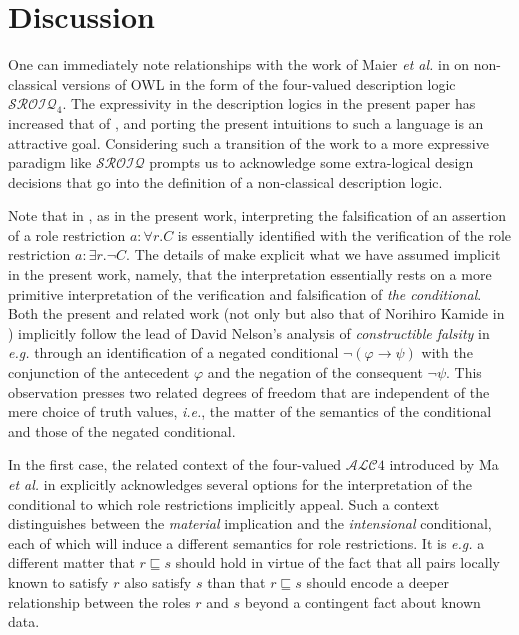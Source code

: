 \documentclass[letterpaper]{article}
\begin{document}


\section{Discussion}

One can immediately note relationships with the work of Maier \emph{et al.} in \cite{DBLP:journals/semweb/MaierMH13} on non-classical versions of OWL in the form of the four-valued description logic $\mathcal{SROIQ}_{4}$. The expressivity in the description logics in the present paper has increased that of \cite{DBLP:conf/dlog/Ferguson21}, and porting the present intuitions to such a language is an attractive goal. Considering such a transition of the work to a more expressive paradigm like $\mathcal{SROIQ}$ prompts us to acknowledge some extra-logical design decisions that go into the definition of a non-classical description logic.

Note that in \cite{DBLP:journals/semweb/MaierMH13}, as in the present work, interpreting the falsification of an assertion of a role restriction $a:\forall r.C$ is essentially identified with the verification of the role restriction $a:\exists r.\neg C$. The details of \cite{DBLP:journals/semweb/MaierMH13} make explicit what we have assumed implicit in the present work, namely, that the interpretation essentially rests on a more primitive interpretation of the verification and falsification of \emph{the conditional}. Both the present and related work (not only \cite{DBLP:journals/semweb/MaierMH13} but also that of Norihiro Kamide in \cite{DBLP:conf/kes/Kamide11}) implicitly follow the lead of David Nelson's analysis of \emph{constructible falsity} in \emph{e.g.} \cite{DBLP:journals/jsyml/AlmukdadN84} through an identification of a negated conditional $\neg(\varphi\rightarrow\psi)$ with the conjunction of the antecedent $\varphi$ and the negation of the consequent $\neg\psi$. This observation presses two related degrees of freedom that are independent of the mere choice of truth values, \emph{i.e.}, the matter of the semantics of the conditional and those of the negated conditional.

In the first case, the related context of the four-valued $\mathcal{ALC}4$ introduced by Ma \emph{et al.} in \cite{DBLP:conf/esws/MaHL07} explicitly acknowledges several options for the interpretation of the conditional to which role restrictions implicitly appeal. Such a context distinguishes between the \emph{material} implication and the \emph{intensional} conditional, each of which will induce a different semantics for role restrictions. It is \emph{e.g.} a different matter that $r\sqsubseteq s$ should hold in virtue of the fact that all pairs locally known to satisfy $r$ also satisfy $s$ than that $r\sqsubseteq s$ should encode a deeper relationship between the roles $r$ and $s$ beyond a contingent fact about known data.
\end{document}
